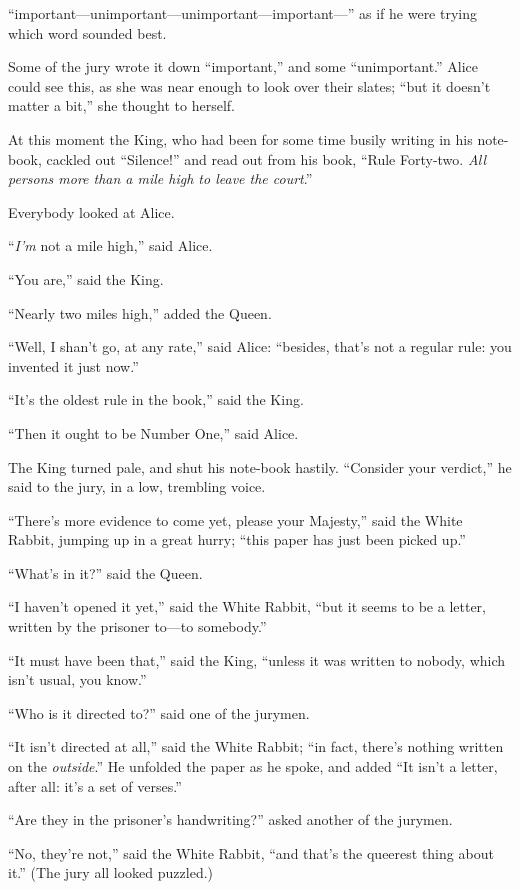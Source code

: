 \documentclass[book, 20pt]{extbook}
\begin{document}
``important---unimportant---unimportant---important---'' as if he were
trying which word sounded best.

Some of the jury wrote it down ``important,'' and some ``unimportant.''
Alice could see this, as she was near enough to look over their slates;
``but it doesn't matter a bit,'' she thought to herself.

At this moment the King, who had been for some time busily writing in
his note-book, cackled out ``Silence!'' and read out from his book,
``Rule Forty-two. \emph{All persons more than a mile high to leave the
court}.''

Everybody looked at Alice.

``\emph{I'm} not a mile high,'' said Alice.

``You are,'' said the King.

``Nearly two miles high,'' added the Queen.

``Well, I shan't go, at any rate,'' said Alice: ``besides, that's not a
regular rule: you invented it just now.''

``It's the oldest rule in the book,'' said the King.

``Then it ought to be Number One,'' said Alice.

The King turned pale, and shut his note-book hastily. ``Consider your
verdict,'' he said to the jury, in a low, trembling voice.

``There's more evidence to come yet, please your Majesty,'' said the
White Rabbit, jumping up in a great hurry; ``this paper has just been
picked up.''

``What's in it?'' said the Queen.

``I haven't opened it yet,'' said the White Rabbit, ``but it seems to be
a letter, written by the prisoner to---to somebody.''

``It must have been that,'' said the King, ``unless it was written to
nobody, which isn't usual, you know.''

``Who is it directed to?'' said one of the jurymen.

``It isn't directed at all,'' said the White Rabbit; ``in fact, there's
nothing written on the \emph{outside}.'' He unfolded the paper as he
spoke, and added ``It isn't a letter, after all: it's a set of verses.''

``Are they in the prisoner's handwriting?'' asked another of the
jurymen.

``No, they're not,'' said the White Rabbit, ``and that's the queerest
thing about it.'' (The jury all looked puzzled.)
\end{document}

